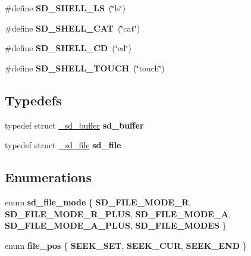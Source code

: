 \begin{DoxyCompactItemize}
\item 
\hypertarget{group__sd__public_ga22406808e8ee8a624cdc5907460b3116}{\#define {\bfseries \-S\-D\-\_\-\-S\-H\-E\-L\-L\-\_\-\-L\-S}~(\char`\"{}ls\char`\"{})}\label{group__sd__public_ga22406808e8ee8a624cdc5907460b3116}

\item 
\hypertarget{group__sd__public_gadedf3ed15c6eae02a70d5d68ff99cece}{\#define {\bfseries \-S\-D\-\_\-\-S\-H\-E\-L\-L\-\_\-\-C\-A\-T}~(\char`\"{}cat\char`\"{})}\label{group__sd__public_gadedf3ed15c6eae02a70d5d68ff99cece}

\item 
\hypertarget{group__sd__public_ga6608a5ac2b0438ca1c0be83ee6673032}{\#define {\bfseries \-S\-D\-\_\-\-S\-H\-E\-L\-L\-\_\-\-C\-D}~(\char`\"{}cd\char`\"{})}\label{group__sd__public_ga6608a5ac2b0438ca1c0be83ee6673032}

\item 
\hypertarget{group__sd__public_gab9d5b49884f9f55508a7d581039a0026}{\#define {\bfseries \-S\-D\-\_\-\-S\-H\-E\-L\-L\-\_\-\-T\-O\-U\-C\-H}~(\char`\"{}touch\char`\"{})}\label{group__sd__public_gab9d5b49884f9f55508a7d581039a0026}

\end{DoxyCompactItemize}
\subsection*{\-Typedefs}
\begin{DoxyCompactItemize}
\item 
\hypertarget{group__sd__public_ga1c76037c62c46cef034ba7ba569120f1}{typedef struct \hyperlink{struct__sd__buffer}{\-\_\-sd\-\_\-buffer} {\bfseries sd\-\_\-buffer}}\label{group__sd__public_ga1c76037c62c46cef034ba7ba569120f1}

\item 
\hypertarget{group__sd__public_ga7c6b819d64f1bcac5c28ea3cf039abce}{typedef struct \hyperlink{struct__sd__file}{\-\_\-sd\-\_\-file} {\bfseries sd\-\_\-file}}\label{group__sd__public_ga7c6b819d64f1bcac5c28ea3cf039abce}

\end{DoxyCompactItemize}
\subsection*{\-Enumerations}
\begin{DoxyCompactItemize}
\item 
enum {\bfseries sd\-\_\-file\-\_\-mode} \{ \*
{\bfseries \-S\-D\-\_\-\-F\-I\-L\-E\-\_\-\-M\-O\-D\-E\-\_\-\-R}, 
{\bfseries \-S\-D\-\_\-\-F\-I\-L\-E\-\_\-\-M\-O\-D\-E\-\_\-\-R\-\_\-\-P\-L\-U\-S}, 
{\bfseries \-S\-D\-\_\-\-F\-I\-L\-E\-\_\-\-M\-O\-D\-E\-\_\-\-A}, 
{\bfseries \-S\-D\-\_\-\-F\-I\-L\-E\-\_\-\-M\-O\-D\-E\-\_\-\-A\-\_\-\-P\-L\-U\-S}, 
\*
{\bfseries \-S\-D\-\_\-\-F\-I\-L\-E\-\_\-\-M\-O\-D\-E\-S}
 \}
\item 
enum {\bfseries file\-\_\-pos} \{ {\bfseries \-S\-E\-E\-K\-\_\-\-S\-E\-T}, 
{\bfseries \-S\-E\-E\-K\-\_\-\-C\-U\-R}, 
{\bfseries \-S\-E\-E\-K\-\_\-\-E\-N\-D}
 \}
\end{DoxyCompactItemize}
